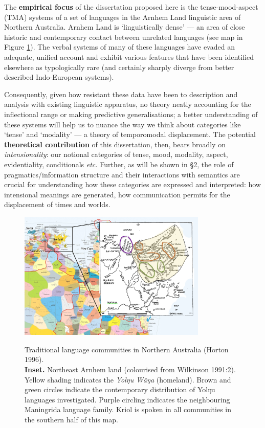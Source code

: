 \documentclass[12pt]{article}
\begin{document}
The \textbf{empirical focus} of the dissertation proposed here is the tense-mood-aspect (TMA) systems of a set of languages in the Arnhem Land linguistic area of Northern Australia. Arnhem Land is `linguistically dense' --- an area of close historic and contemporary contact between unrelated languages (see map in Figure \ref{map}). The verbal systems of many of these languages have evaded an adequate, unified account and exhibit various features that have been identified elsewhere as typologically rare (and certainly sharply diverge from better described Indo-European systems).

Consequently, given how resistant these data have been to description and analysis with existing linguistic apparatus, no theory neatly accounting for the inflectional range or making predictive generalisations; a better understanding of these systems will help us to nuance the way we think about categories like `tense' and `modality' --- a theory of temporomodal displacement. The potential \textbf{theoretical contribution} of this dissertation, then, bears broadly on \textit{intensionality}: our notional categories of tense, mood, modality, aspect, evidentiality, conditionals \textit{etc.} Further, as will be shown in §2, the role of pragmatics/information structure and their interactions with semantics are crucial for understanding how these categories are expressed and interpreted: how intensional meanings are generated, how communication permits for the displacement of times and worlds.



\begin{figure}
\centering\caption{Traditional language communities in Northern Australia (Horton 1996).\\\textbf{Inset. }Northeast Arnhem land (colourised from Wilkinson 1991:2). Yellow shading indicates the \textit{Yolŋu Wäŋa} (homeland). Brown and green circles indicate the contemporary distribution of Yolŋu languages investigated. Purple circling indicates the neighbouring Maningrida language family. Kriol is spoken in all communities in the southern half of this map.}	\includegraphics[width=0.8\textwidth]{AustralianLangsCropped.png}\label{map}
\end{figure}
\end{document}
